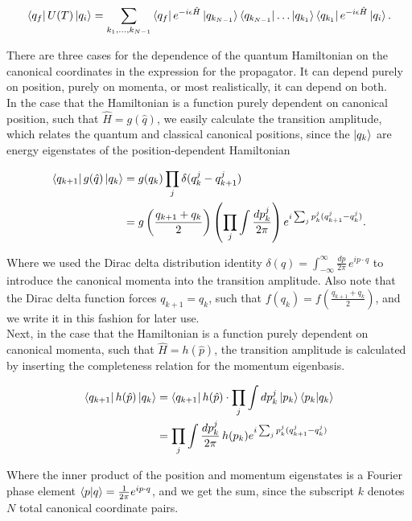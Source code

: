 \begin{equation}
\bra{q_f} U(T) \ket{q_i} = \sum_{k_1,\dots,k_{N-1}} \bra{q_f} e^{-i \epsilon \hat{H}} \ket{q_{k_{N-1}}} \bra{q_{k_{N-1}}} \dots \ket{q_{k_1}}\bra{q_{k_1}} e^{-i \epsilon \hat{H}} \ket{q_i}.
\end{equation}

\noindent There are three cases for the dependence of the quantum Hamiltonian on the canonical coordinates in the expression for the propagator. It can depend purely on position, purely on momenta, or most realistically, it can depend on both. \\

\noindent In the case that the Hamiltonian is a function purely dependent on canonical position, such that $\hat{H} = g(\hat{q})$, we easily calculate the transition amplitude, which relates the quantum and classical canonical positions, since the $\ket{q_k}$ are energy eigenstates of the position-dependent Hamiltonian

\begin{align}
\bra{q_{k+1}} g(\hat{q}) \ket{q_k} &= g(q_k) \prod_j \delta ( q_k^j - q_{k+1}^j ) \\
&= g \left( \frac{q_{k+1} + q_k}{2} \right) \left( \prod_j \int \frac{dp_k^j}{2\pi} \right) e^{ i \sum_j p_k^j (q_{k+1}^j - q_k^j ) }.
\end{align}

\noindent Where we used the Dirac delta distribution identity $\delta (q) = \int_{-\infty}^{\infty} \frac{dp}{2\pi} \, e^{i p \cdot q}$ to introduce the canonical momenta into the transition amplitude. Also note that the Dirac delta function forces $q_{k+1} = q_k$, such that $f(q_k) = f(\frac{q_{k+1} + q_k}{2})$, and we write it in this fashion for later use. \\

\noindent Next, in the case that the Hamiltonian is a function purely dependent on canonical momenta, such that $\hat{H} = h(\hat{p})$, the transition amplitude is calculated by inserting the completeness relation for the momentum eigenbasis.

\begin{align}
\bra{q_{k+1}} h(\hat{p}) \ket{q_k} &= \bra{q_{k+1}} h(\hat{p}) \cdot \prod_j \int dp_k^j \ket{p_k} \braket{p_k | q_k} \\
&= \prod_j \int \frac{dp_k^j}{2\pi} \, h(p_k) e^{ i \sum_j p_k^j (q_{k+1}^j - q_k^j ) }
\end{align}

\noindent Where the inner product of the position and momentum eigenstates is a Fourier phase element $\braket{p | q} = \frac{1}{2\pi} e^{i p \cdot q}$, and we get the sum, since the subscript $k$ denotes $N$ total canonical coordinate pairs. \\

